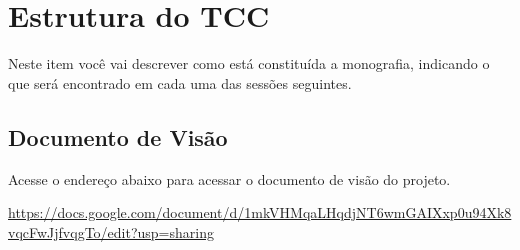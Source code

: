 \section{Estrutura do TCC}
Neste item você vai descrever como está constituída a monografia, indicando o
que será encontrado em cada uma das sessões seguintes.

\subsection{Documento de Visão}

Acesse o endereço abaixo para acessar o documento de visão do projeto.

\url{https://docs.google.com/document/d/1mkVHMqaLHqdjNT6wmGAIXxp0u94Xk8vqcFwJjfvqgTo/edit?usp=sharing}
